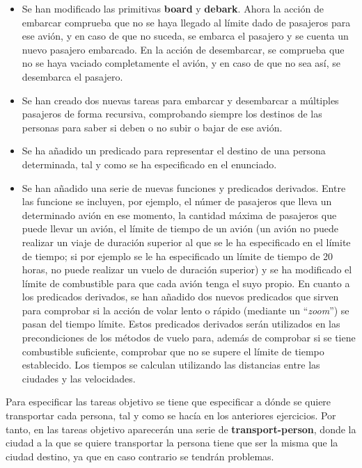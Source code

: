 \documentclass[11pt,a4paper]{article}
\begin{document}
\begin{itemize}[label=\textbullet]
	\item Se han modificado las primitivas \textbf{board} y \textbf{debark}. Ahora la acción de embarcar comprueba que no se haya
	llegado al límite dado de pasajeros para ese avión, y en caso de que no suceda, se embarca el pasajero y se cuenta un nuevo
	pasajero embarcado. En la acción de desembarcar, se comprueba que no se haya vaciado completamente el avión, y en caso de que
	no sea así, se desembarca el pasajero.
	\item Se han creado dos nuevas tareas para embarcar y desembarcar a múltiples pasajeros de forma recursiva, comprobando siempre
	los destinos de las personas para saber si deben o no subir o bajar de ese avión.
	\item Se ha añadido un predicado para representar el destino de una persona determinada, tal y como se ha especificado en el
	enunciado.
	\item Se han añadido una serie de nuevas funciones y predicados derivados. Entre las funcione se incluyen, por ejemplo, el númer
	de pasajeros que lleva un determinado avión en ese momento, la cantidad máxima de pasajeros que puede llevar un avión, el límite
	de tiempo de un avión (un avión no puede realizar un viaje de duración superior al que se le ha especificado en el límite de
	tiempo; si por ejemplo se le ha especificado un límite de tiempo de 20 horas, no puede realizar un vuelo de duración superior)
	y se ha modificado el límite de combustible para que cada avión tenga el suyo propio. En cuanto a los predicados derivados, se han
	añadido dos nuevos predicados que sirven para comprobar si la acción de volar lento o rápido (mediante un ``\textit{zoom}'') se
	pasan del tiempo límite. Estos predicados derivados serán utilizados en las precondiciones de los métodos de vuelo para, además
	de comprobar si se tiene combustible suficiente, comprobar que no se supere el límite de tiempo establecido. Los tiempos se
	calculan utilizando las distancias entre las ciudades y las velocidades.
\end{itemize}

Para especificar las tareas objetivo se tiene que especificar a dónde se quiere transportar cada persona, tal y como se hacía en los
anteriores ejercicios. Por tanto, en las tareas objetivo aparecerán una serie de \textbf{transport-person}, donde la ciudad a la
que se quiere transportar la persona tiene que ser la misma que la ciudad destino, ya que en caso contrario se tendrán problemas.
\end{document}
